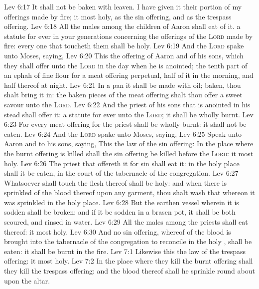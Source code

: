 \vs Lev 6:17 It shall not be baken with leaven. I have given it  their portion of my offerings made by fire; it  most holy, as  the sin offering, and as the trespass offering.
\vs Lev 6:18 All the males among the children of Aaron shall eat of it.  a statute for ever in your generations concerning the offerings of the \textsc{Lord} made by fire: every one that toucheth them shall be holy.
\vs Lev 6:19 And the \textsc{Lord} spake unto Moses, saying,
\vs Lev 6:20 This  the offering of Aaron and of his sons, which they shall offer unto the \textsc{Lord} in the day when he is anointed; the tenth part of an ephah of fine flour for a meat offering perpetual, half of it in the morning, and half thereof at night.
\vs Lev 6:21 In a pan it shall be made with oil;  baken, thou shalt bring it in:  the baken pieces of the meat offering shalt thou offer  a sweet savour unto the \textsc{Lord}.
\vs Lev 6:22 And the priest of his sons that is anointed in his stead shall offer it:  a statute for ever unto the \textsc{Lord}; it shall be wholly burnt.
\vs Lev 6:23 For every meat offering for the priest shall be wholly burnt: it shall not be eaten.
\vs Lev 6:24 And the \textsc{Lord} spake unto Moses, saying,
\vs Lev 6:25 Speak unto Aaron and to his sons, saying, This  the law of the sin offering: In the place where the burnt offering is killed shall the sin offering be killed before the \textsc{Lord}: it  most holy.
\vs Lev 6:26 The priest that offereth it for sin shall eat it: in the holy place shall it be eaten, in the court of the tabernacle of the congregation.
\vs Lev 6:27 Whatsoever shall touch the flesh thereof shall be holy: and when there is sprinkled of the blood thereof upon any garment, thou shalt wash that whereon it was sprinkled in the holy place.
\vs Lev 6:28 But the earthen vessel wherein it is sodden shall be broken: and if it be sodden in a brasen pot, it shall be both scoured, and rinsed in water.
\vs Lev 6:29 All the males among the priests shall eat thereof: it  most holy.
\vs Lev 6:30 And no sin offering, whereof  of the blood is brought into the tabernacle of the congregation to reconcile  in the holy , shall be eaten: it shall be burnt in the fire.
\vs Lev 7:1 Likewise this  the law of the trespass offering: it  most holy.
\vs Lev 7:2 In the place where they kill the burnt offering shall they kill the trespass offering: and the blood thereof shall he sprinkle round about upon the altar.
